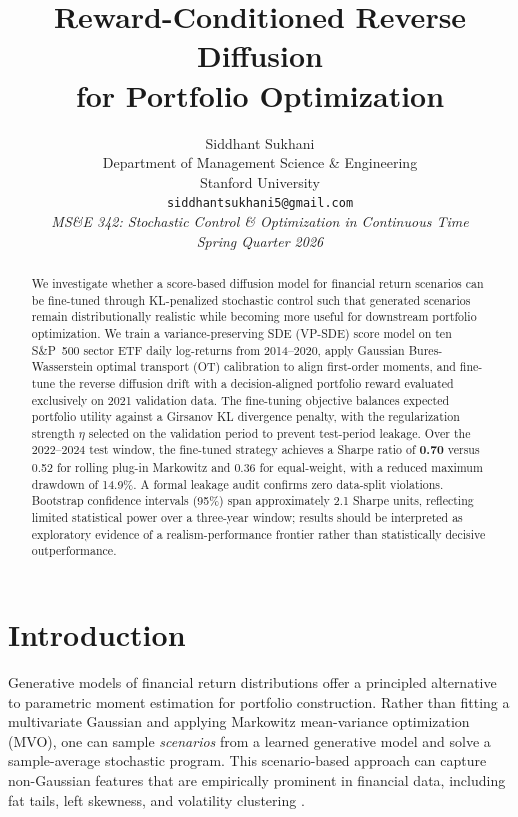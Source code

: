 \documentclass{article}
\title{Reward-Conditioned Reverse Diffusion\\for Portfolio Optimization}
\author{%
  Siddhant Sukhani \\
  Department of Management Science \& Engineering \\
  Stanford University \\
  \texttt{siddhantsukhani5@gmail.com} \\[4pt]
  \textit{MS\&E 342: Stochastic Control \& Optimization in Continuous Time} \\
  \textit{Spring Quarter 2026}
}
\begin{document}
\maketitle

\begin{abstract}
We investigate whether a score-based diffusion model for financial return
scenarios can be fine-tuned through KL-penalized stochastic control such that
generated scenarios remain distributionally realistic while becoming more useful
for downstream portfolio optimization. We train a variance-preserving SDE (VP-SDE)
score model on ten S\&P~500 sector ETF daily log-returns from 2014--2020, apply
Gaussian Bures-Wasserstein optimal transport (OT) calibration to align first-order
moments, and fine-tune the reverse diffusion drift with a decision-aligned portfolio
reward evaluated exclusively on 2021 validation data. The fine-tuning objective
balances expected portfolio utility against a Girsanov KL divergence penalty, with
the regularization strength $\eta$ selected on the validation period to prevent
test-period leakage. Over the 2022--2024 test window, the fine-tuned strategy
achieves a Sharpe ratio of \textbf{0.70} versus 0.52 for rolling plug-in Markowitz
and 0.36 for equal-weight, with a reduced maximum drawdown of 14.9\%. A formal
leakage audit confirms zero data-split violations. Bootstrap confidence intervals
(95\%) span approximately 2.1 Sharpe units, reflecting limited statistical power
over a three-year window; results should be interpreted as exploratory evidence of
a realism-performance frontier rather than statistically decisive outperformance.
\end{abstract}

\section{Introduction}
\label{sec:intro}

Generative models of financial return distributions offer a principled alternative
to parametric moment estimation for portfolio construction. Rather than fitting a
multivariate Gaussian and applying Markowitz mean-variance optimization (MVO),
one can sample \emph{scenarios} from a learned generative model and solve a
sample-average stochastic program. This scenario-based approach can capture
non-Gaussian features that are empirically prominent in financial data, including
fat tails, left skewness, and volatility clustering \citep{cont2001,
mcneil2015quantitative}.
\end{document}
